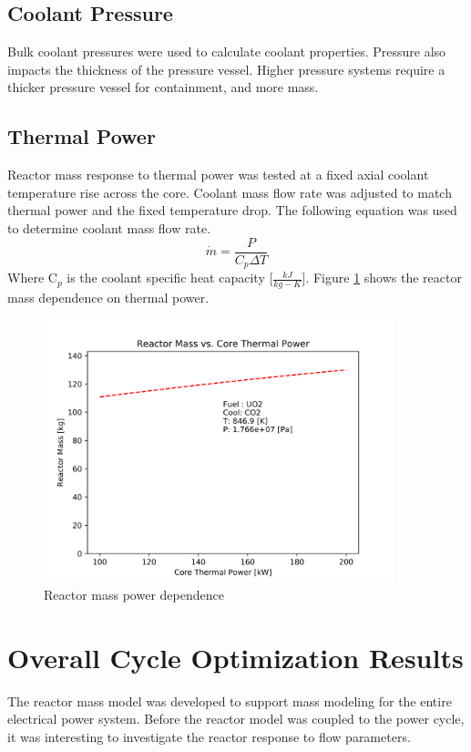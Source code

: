 \subsection{Coolant Pressure}
Bulk coolant pressures were used to calculate coolant properties. Pressure also
impacts the thickness of the pressure vessel. Higher pressure systems require a
thicker pressure vessel for containment, and more mass.

\subsection{Thermal Power}
Reactor mass response to thermal power was tested at a fixed axial coolant temperature
rise across the core. Coolant mass flow rate was adjusted to match thermal power
and the fixed temperature drop. The following equation was used to determine
coolant mass flow rate.
\begin{equation}
    \dot{m} = \frac{P}{C_p \Delta T}
\end{equation}
Where C$_p$ is the coolant specific heat capacity [$\frac{kJ}{kg-K}$].
Figure \ref{fig:mass_vs_q_uo2_co2} shows the reactor mass dependence on thermal
power.

\begin{figure}[h]
    \centering
    \includegraphics[width=4in]{../images/mass_vs_q_uo2_co2.png}
\caption{Reactor mass power dependence}
\label{fig:mass_vs_q_uo2_co2}
\end{figure}

\section{Overall Cycle Optimization Results}
The reactor mass model was developed to support mass modeling for the entire
electrical power system. Before the reactor model was coupled to the power
cycle, it was interesting to investigate the reactor response to flow
parameters. 

